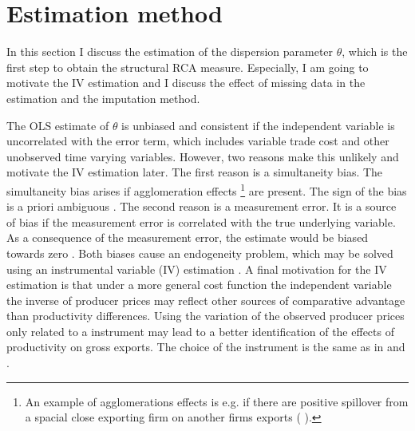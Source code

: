 \section{Estimation method}
In this section I discuss the estimation of the dispersion parameter $\theta$, which is the first step to obtain the structural RCA measure.
Especially, I am going to motivate the IV estimation and I discuss the effect of missing data in the estimation and the imputation method.\par %
The OLS estimate of $\theta$ is unbiased  and consistent if the independent variable is uncorrelated with the error term, which includes variable trade cost and other unobserved time varying variables.
 However, two reasons make this unlikely and motivate the IV estimation later.
The first reason is a simultaneity bias. The simultaneity bias arises if agglomeration effects \footnote{An example of agglomerations effects is e.g. if there are positive spillover from a spacial close exporting firm on another firms exports (\cite{bernard2004} ).} are present. The sign of the bias is a priori ambiguous \parencite{costinot}.
The second reason is a measurement error. It is a source of bias if the measurement error is correlated with the true underlying variable.
As a consequence of the measurement error, the estimate would be biased towards zero \parencite[p.85]{greene}.
Both biases cause an endogeneity problem, which may be solved using an instrumental variable (IV) estimation  \parencite[p.139]{Dhaene}.
A final motivation for the IV estimation is that under a more general cost function the independent variable the inverse of producer prices may reflect other sources of comparative advantage than productivity differences. Using the variation of the observed producer prices only related to a instrument may lead to a better identification of the effects of productivity on gross exports. The choice of the instrument is the same as in \textcite{costinot} and \textcite{eaton}. \par
